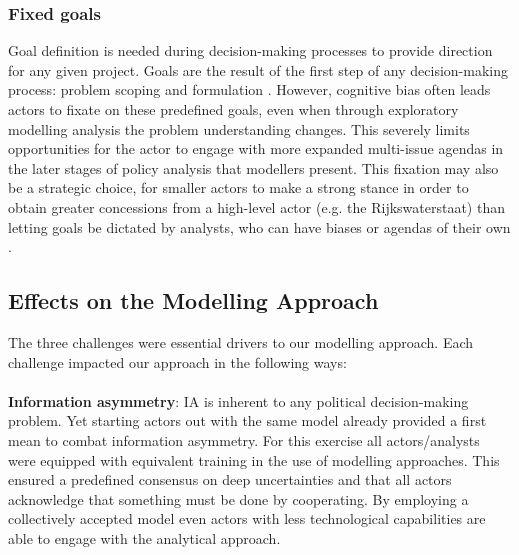 \subsubsection{Fixed goals}
Goal definition is needed during decision-making processes to provide direction for any given project. Goals are the result of the first step of any decision-making process: problem scoping and formulation \parencite{enserink_policy_2010}. However, cognitive bias often leads actors to fixate on these predefined goals, even when through exploratory modelling analysis the problem understanding changes. This severely limits opportunities for the actor to engage with more expanded multi-issue agendas in the later stages of policy analysis that modellers present. This fixation may also be a strategic choice, for smaller actors to make a strong stance in order to obtain greater concessions from a high-level actor (e.g. the Rijkswaterstaat) than letting goals be dictated by analysts, who can have biases or agendas of their own \parencite{hans_de_bruijn_mark_de_bruijne_ernst_ten_heuvelhof_politics_2015}. 

\subsection{Effects on the Modelling Approach}

The three challenges were essential drivers to our modelling approach. Each challenge impacted our approach in the following ways: \\
\\
\textbf{Information asymmetry}: IA is inherent to any political decision-making problem. Yet starting actors out with the same model already provided a first mean to combat information asymmetry. For this exercise all actors/analysts were equipped with equivalent training in the use of modelling approaches. This ensured a predefined consensus on deep uncertainties and that all actors acknowledge that something must be done by cooperating. By employing a collectively accepted model even actors with less technological capabilities are able to engage with the analytical approach.

